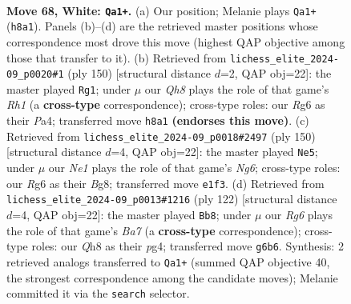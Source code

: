 \documentclass[11pt]{article}
\begin{document}
\clearpage

\begin{figure}[p]\centering
\begin{subfigure}{0.46\textwidth}\centering
\resizebox{\linewidth}{!}{%
\newchessgame
\chessboard[
  setfen={7Q/8/6R1/8/8/8/5K2/3kN3 w - - 1 68},
  showmover=false,
  pgfstyle=straightmove, color=movearrow, markmove={h8-a1}
]}
\caption{}
\end{subfigure}\hfill
\begin{subfigure}{0.46\textwidth}\centering
\resizebox{\linewidth}{!}{%
\newchessgame
\chessboard[
  setfen={8/3K1k2/4N3/8/P7/8/8/7R w - - 14 76},
  showmover=false,
  pgfstyle=straightmove, color=movearrow, markmove={h1-g1}
]}
\caption{}
\end{subfigure}
\\[4pt]
\begin{subfigure}{0.46\textwidth}\centering
\resizebox{\linewidth}{!}{%
\newchessgame
\chessboard[
  setfen={6B1/8/5KN1/7k/8/8/8/8 w - - 15 76},
  showmover=false,
  pgfstyle=straightmove, color=movearrow, markmove={g6-e5}
]}
\caption{}
\end{subfigure}\hfill
\begin{subfigure}{0.46\textwidth}\centering
\resizebox{\linewidth}{!}{%
\newchessgame
\chessboard[
  setfen={8/B7/4K3/3N4/4k1p1/8/8/8 w - - 0 62},
  showmover=false,
  pgfstyle=straightmove, color=movearrow, markmove={a7-b8}
]}
\caption{}
\end{subfigure}
\caption{\textbf{Move 68, White: \texttt{Qa1+}.} (a) Our position; Melanie plays \texttt{Qa1+} (\texttt{h8a1}). Panels (b)--(d) are the retrieved master positions whose correspondence most drove this move (highest QAP objective among those that transfer to it). (b) Retrieved from \texttt{lichess\_elite\_2024-09\_p0020\#1} (ply 150) [structural distance $d$=2, QAP obj=22]: the master played \texttt{Rg1}; under $\mu$ our \emph{Qh8} plays the role of that game's \emph{Rh1} (a \textbf{cross-type} correspondence); cross-type roles: our \emph{R}g6 as their \emph{P}a4; transferred move \texttt{h8a1} \textbf{(endorses this move)}. (c) Retrieved from \texttt{lichess\_elite\_2024-09\_p0018\#2497} (ply 150) [structural distance $d$=4, QAP obj=22]: the master played \texttt{Ne5}; under $\mu$ our \emph{Ne1} plays the role of that game's \emph{Ng6}; cross-type roles: our \emph{R}g6 as their \emph{B}g8; transferred move \texttt{e1f3}. (d) Retrieved from \texttt{lichess\_elite\_2024-09\_p0013\#1216} (ply 122) [structural distance $d$=4, QAP obj=22]: the master played \texttt{Bb8}; under $\mu$ our \emph{Rg6} plays the role of that game's \emph{Ba7} (a \textbf{cross-type} correspondence); cross-type roles: our \emph{Q}h8 as their \emph{p}g4; transferred move \texttt{g6b6}. Synthesis: 2 retrieved analogs transferred to \texttt{Qa1+} (summed QAP objective 40, the strongest correspondence among the candidate moves); Melanie committed it via the \texttt{search} selector.}
\label{fig:thought-m134}
\end{figure}
\end{document}
